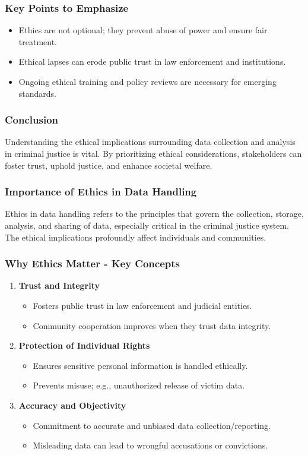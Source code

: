 \documentclass[aspectratio=169]{beamer}
\begin{document}
\begin{frame}[fragile]
    \frametitle{Key Points to Emphasize}
    \begin{itemize}
        \item Ethics are not optional; they prevent abuse of power and ensure fair treatment.
        \item Ethical lapses can erode public trust in law enforcement and institutions.
        \item Ongoing ethical training and policy reviews are necessary for emerging standards.
    \end{itemize}
\end{frame}

\begin{frame}[fragile]
    \frametitle{Conclusion}
    Understanding the ethical implications surrounding data collection and analysis in criminal justice is vital. By prioritizing ethical considerations, stakeholders can foster trust, uphold justice, and enhance societal welfare.
\end{frame}

\begin{frame}[fragile]
    \frametitle{Importance of Ethics in Data Handling}
    Ethics in data handling refers to the principles that govern the collection, storage, analysis, and sharing of data, especially critical in the criminal justice system. The ethical implications profoundly affect individuals and communities.
\end{frame}

\begin{frame}[fragile]
    \frametitle{Why Ethics Matter - Key Concepts}
    \begin{enumerate}
        \item \textbf{Trust and Integrity}
        \begin{itemize}
            \item Fosters public trust in law enforcement and judicial entities.
            \item Community cooperation improves when they trust data integrity.
        \end{itemize}

        \item \textbf{Protection of Individual Rights}
        \begin{itemize}
            \item Ensures sensitive personal information is handled ethically.
            \item Prevents misuse; e.g., unauthorized release of victim data.
        \end{itemize}

        \item \textbf{Accuracy and Objectivity}
        \begin{itemize}
            \item Commitment to accurate and unbiased data collection/reporting.
            \item Misleading data can lead to wrongful accusations or convictions.
        \end{itemize}
    \end{enumerate}
\end{frame}
\end{document}
